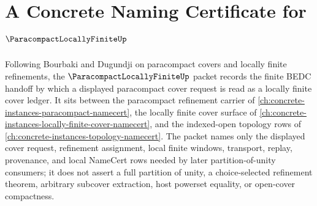 \chapter{A Concrete Naming Certificate for $\ParacompactLocallyFiniteUp$}
\label{ch:concrete-instances-paracompact-locally-finite-namecert}

Following Bourbaki and Dugundji on paracompact covers and locally finite refinements, the $\ParacompactLocallyFiniteUp$ packet records the finite BEDC handoff by which a displayed paracompact cover request is read as a locally finite cover ledger. It sits between the paracompact refinement carrier of \autoref{ch:concrete-instances-paracompact-namecert}, the locally finite cover surface of \autoref{ch:concrete-instances-locally-finite-cover-namecert}, and the indexed-open topology rows of \autoref{ch:concrete-instances-topology-namecert}. The packet names only the displayed cover request, refinement assignment, local finite windows, transport, replay, provenance, and local NameCert rows needed by later partition-of-unity consumers; it does not assert a full partition of unity, a choice-selected refinement theorem, arbitrary subcover extraction, host powerset equality, or open-cover compactness.

